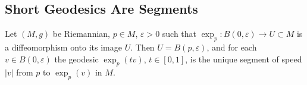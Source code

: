 \subsection{Short Geodesics Are Segments}

\begin{theorem}
  \label{thm:pet-ch5-short-geodesics-segments}
  Let $(M,g)$ be Riemannian, $p\in M$, $\varepsilon>0$ such that
  $\exp_p:B(0,\varepsilon)\to U\subset M$ is a diffeomorphism onto its image $U$.
  Then $U=B(p,\varepsilon)$, and for each $v\in B(0,\varepsilon)$ the geodesic
  $\exp_p(tv)$, $t\in[0,1]$, is the unique segment of speed $|v|$ from $p$ to
  $\exp_p(v)$ in $M$.
\end{theorem}

